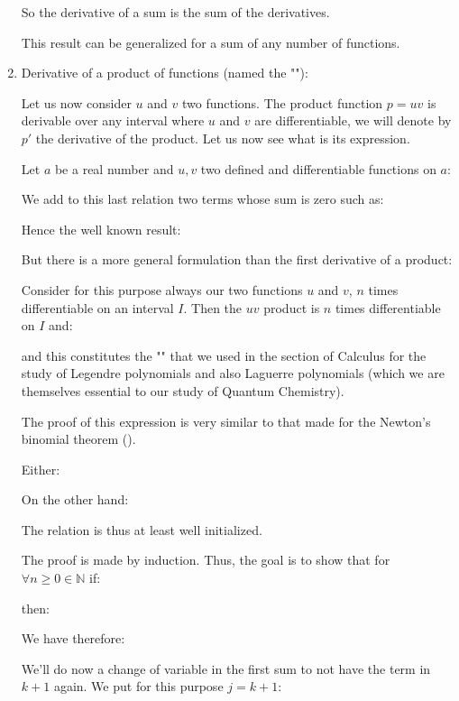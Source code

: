 \begin{enumerate}
		 
		 So the derivative of a sum is the sum of the derivatives.
		 
		 This result can be generalized for a sum of any number of functions.
		 
		 \item Derivative of a product of functions (named the ""):
		 
		 Let us now consider $u$ and $v$ two functions. The product function $p=uv$ is derivable over any interval where $u$ and $v$ are differentiable, we will denote by $p'$ the derivative of the product. Let us now see what is its expression.
		 
		 Let $a$ be a real number and $u,v$ two defined and differentiable functions on $a$:
		 
		 
		 We add to this last relation two terms whose sum is zero such as:
		 
		 Hence the well known result:
		
		 But there is a more general formulation than the first derivative of a product:
		 \begin{theorem}
		 	Consider for this purpose always our two functions $u$ and $v$, $n$ times differentiable on an interval $I$. Then the $uv$ product is $n$ times differentiable on $I$ and:
		 		 	
		 	and this constitutes the "\label{Leibniz differentiation rule for products}" that we used in the section of Calculus for the study of Legendre polynomials and also Laguerre polynomials (which we are themselves essential to our study of Quantum Chemistry).
		 	
		 	The proof of this expression is very similar to that made for the Newton's binomial theorem ().
		 \end{theorem}
		 \begin{dem}
		 	Either:
		 	
		 	On the other hand:
		 	
		 	The relation is thus at least well initialized.
		 	
		 	The proof is made by induction. Thus, the goal is to show that for $\forall n \geq 0 \in \mathbb{N}$ if:
		 	
		 	then:
		 	
		 	We have therefore:
		 	
		 	We'll do now a change of variable in the first sum to not have the term in $k + 1$ again. We put for this purpose $j=k+1$:
		 	

\end{dem}
\end{enumerate}
